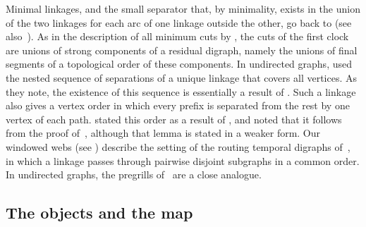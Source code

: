 \documentclass[fontsize=12pt,leading=14pt]{fullpaper}
\begin{document}
Minimal linkages, and the small separator that, by minimality, exists in the union of the two linkages for each arc of one linkage outside the other, go back to \textcite[Definition~2.13 and Lemma~2.15]{KawarabayashiK15} (see also~\cite[Definition~2.3 and Observation~2.5]{HKMM26a}).
As in the description of all minimum cuts by \textcite{PicardQ80}, the cuts of the first clock are unions of strong components of a residual digraph, namely the unions of final segments of a topological order of these components.
In undirected graphs, \textcite[(3.2) and the proof of~(3.1)]{LeafS15} used the nested sequence of separations of a unique linkage that covers all vertices.
As they note, the existence of this sequence is essentially a result of \textcite[(12.1)]{RobertsonS-GMXXI}.
Such a linkage also gives a vertex order in which every prefix is separated from the rest by one vertex of each path.
\textcite[Lemma~4.6]{CT21} stated this order as a result of \textcite{RobertsonS83}, and noted that it follows from the proof of~\cite[Lemma~2.5]{RobertsonS83}, although that lemma is stated in a weaker form.
Our windowed webs (see ) describe the setting of the routing temporal digraphs of~\cite[Definition~6.3]{HKMM26a}, in which a linkage passes through pairwise disjoint subgraphs in a common order.
In undirected graphs, the pregrills of~\cite[Section~2]{LeafS15} are a close analogue.
\subsection{The objects and the map}\label{sec:ov-notions}
\end{document}

